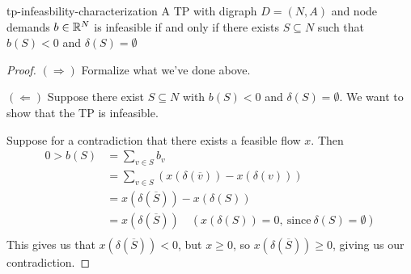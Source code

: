 \begin{theorem}{}{tp-infeasbility-characterization}
    A TP with digraph $D = (N,A)$ and node demands $b \in \mathbb{R}^N$ is infeasible if and only if there exists $S \subseteq N$ such that $b(S) < 0$ and $\delta(S) = \emptyset$
\end{theorem}
\begin{proof}
    $(\Rightarrow)$ Formalize what we've done above.

    $(\Leftarrow)$ Suppose there exist $S \subseteq N$ with $b(S) < 0$ and $\delta(S) = \emptyset$. We want to show that the TP is infeasible.

    Suppose for a contradiction that there exists a feasible flow $x$. Then
    \begin{align*}
        0 > b(S) &= \sum_{v \in S} b_v \\
        &= \sum_{v \in S} (x(\delta(\overline{v})) - x(\delta(v))) \\
        &= x(\delta(\overline{S})) - x(\delta(S)) \\
        &= x(\delta(\overline{S})) \quad (x(\delta(S)) = 0,\:\text{since}\:\delta(S) = \emptyset) \\
    \end{align*}
    This gives us that $x(\delta(\overline{S})) < 0$, but $x \geq 0$, so $x(\delta(\overline{S})) \geq 0$, giving us our contradiction.
\end{proof}